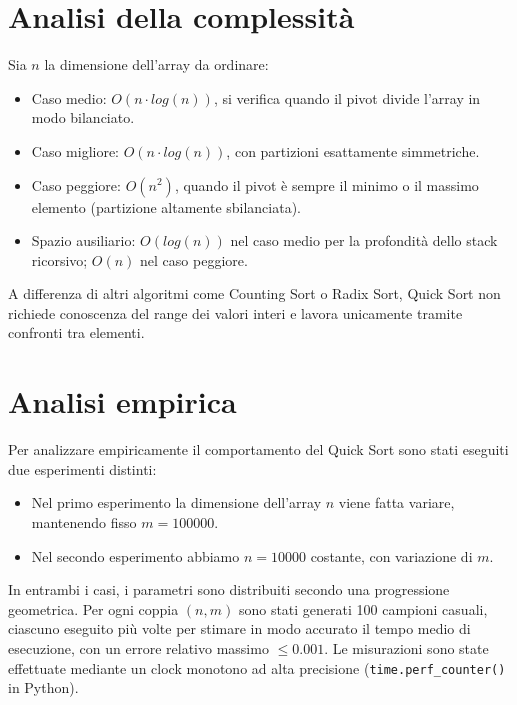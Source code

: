\documentclass[a4paper, 12pt, oneside]{book}
\begin{document}
\section{Analisi della complessità}

Sia \(n\) la dimensione dell'array da ordinare:

\begin{itemize}
    \item Caso medio: \(O(n \cdot log(n))\), si verifica quando il pivot divide l'array in modo bilanciato.
    \item Caso migliore: \(O(n \cdot log(n))\), con partizioni esattamente simmetriche.
    \item Caso peggiore: \(O(n^2)\), quando il pivot è sempre il minimo o il massimo elemento (partizione altamente sbilanciata).
    \item Spazio ausiliario: \(O(log(n))\) nel caso medio per la profondità dello stack ricorsivo; \(O(n)\) nel caso peggiore.
\end{itemize}

\noindent A differenza di altri algoritmi come Counting Sort o Radix Sort, Quick Sort non richiede conoscenza del range dei valori interi e lavora unicamente tramite confronti tra elementi.

\section{Analisi empirica}

Per analizzare empiricamente il comportamento del Quick Sort sono stati eseguiti due esperimenti distinti:

\begin{itemize}
    \item Nel primo esperimento la dimensione dell'array \(n\) viene fatta variare, mantenendo fisso \(m = 100000\).
    \item Nel secondo esperimento abbiamo \(n = 10000\) costante, con variazione di \(m\).
\end{itemize}

\noindent In entrambi i casi, i parametri sono distribuiti secondo una progressione geometrica.
Per ogni coppia \((n, m)\) sono stati generati 100 campioni casuali, ciascuno eseguito più volte per stimare in modo accurato il tempo medio di esecuzione, con un errore relativo massimo \(\leq 0.001\).
Le misurazioni sono state effettuate mediante un clock monotono ad alta precisione (\texttt{time.perf\_counter()} in Python). \\
\end{document}
